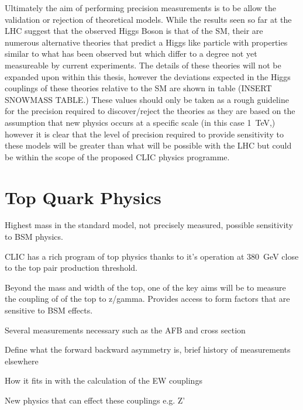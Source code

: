 Ultimately the aim of performing precision measurements is to be allow the validation or rejection of theoretical models. While the results seen so far at the LHC suggest that the observed Higgs Boson is that of the \ac{SM}, their are numerous alternative theories that predict a Higgs like particle with properties similar to what has been observed but which differ to a degree not yet measureable by current experiments. The details of these theories will not be expanded upon within this thesis, however the deviations expected in the Higgs couplings of these theories relative to the \ac{SM} are shown in table (INSERT SNOWMASS TABLE.) These values should only be taken as a rough guideline for the precision required to discover/reject the theories as they are based on the assumption that new physics occurs at a specific scale (in this case 1~TeV,) however it is clear that the level of precision required to provide sensitivity to these models will be greater than what will be possible with the LHC but could be within the scope of the proposed CLIC physics programme.  


\section{Top Quark Physics}

Highest mass in the standard model, not precisely measured, possible sensitivity to BSM physics.

CLIC has a rich program of top physics thanks to it's operation at 380~GeV close to the top pair production threshold.

Beyond the mass and width of the top, one of the key aims will be to measure the coupling of of the top to z/gamma. Provides access to form factors that are sensitive to BSM effects.

Several measurements necessary such as the AFB and cross section

Define what the forward backward asymmetry is, brief history of measurements elsewhere

How it fits in with the calculation of the EW couplings

New physics that can effect these couplings e.g. Z'

